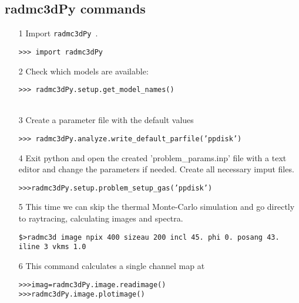 \documentclass[12pt]{article}
\newcommand{\pymod}{{\tt  radmc3dPy }}
\begin{document}
\subsection*{radmc3dPy commands}
\begin{itemize}

\item[1] Import \pymod.

{\tt >>> import radmc3dPy}\\
\item[2] Check which models are available:

{\tt >>> radmc3dPy.setup.get\_model\_names()}\\
\indent {\tt ['ppdisk']}\\
\item[3] Create a parameter file with the default values

{\tt >>> radmc3dPy.analyze.write\_default\_parfile('ppdisk')}\\
\item[4] Exit python and open the created 'problem\_params.inp' file with a text editor and change the parameters if needed. 
Create all necessary imput files.

{\tt>>>radmc3dPy.setup.problem\_setup\_gas('ppdisk')}\\
\item[5] This time we can skip the thermal Monte-Carlo simulation and go directly to raytracing, calculating images
and spectra.

{\tt \$>radmc3d image npix 400 sizeau 200 incl 45. phi 0. posang 43. iline 3 vkms 1.0}\\
\item[6] This command calculates a single channel map at 

{\tt>>>imag=radmc3dPy.image.readimage()}\\
{\tt>>>radmc3dPy.image.plotimage()}

\end{itemize}
\end{document}
